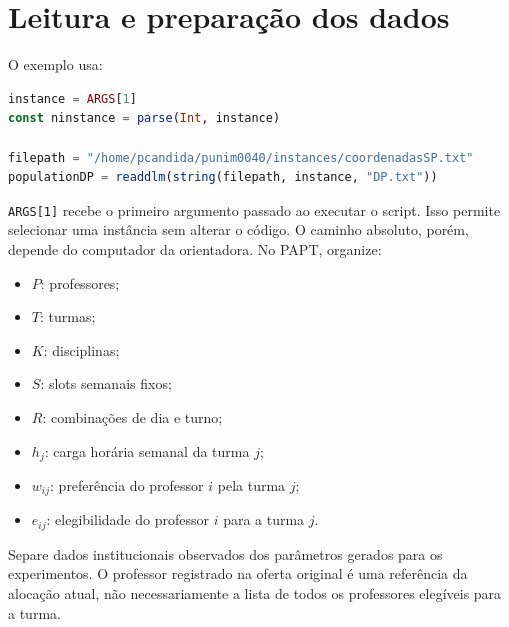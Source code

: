 \documentclass[11pt,a4paper]{article}
\begin{document}
\section{Leitura e preparação dos dados}
O exemplo usa:
\begin{lstlisting}[language=Julia]
instance = ARGS[1]
const ninstance = parse(Int, instance)

filepath = "/home/pcandida/punim0040/instances/coordenadasSP.txt"
populationDP = readdlm(string(filepath, instance, "DP.txt"))
\end{lstlisting}
\texttt{ARGS[1]} recebe o primeiro argumento passado ao executar o script. Isso permite selecionar uma instância sem alterar o código. O caminho absoluto, porém, depende do computador da orientadora.
No PAPT, organize:
\begin{itemize}
\item $P$: professores;
\item $T$: turmas;
\item $K$: disciplinas;
\item $S$: slots semanais fixos;
\item $R$: combinações de dia e turno;
\item $h_j$: carga horária semanal da turma $j$;
\item $w_{ij}$: preferência do professor $i$ pela turma $j$;
\item $e_{ij}$: elegibilidade do professor $i$ para a turma $j$.
\end{itemize}
Separe dados institucionais observados dos parâmetros gerados para os experimentos. O professor registrado na oferta original é uma referência da alocação atual, não necessariamente a lista de todos os professores elegíveis para a turma.
\end{document}
